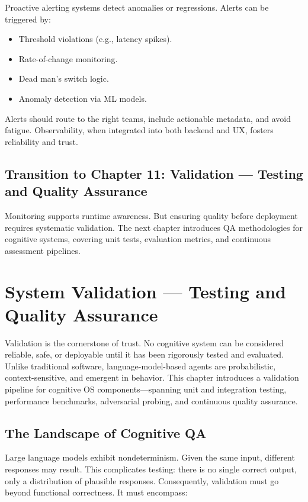 \documentclass{book}
\begin{document}
Proactive alerting systems detect anomalies or regressions. Alerts can be triggered by:

\begin{itemize}
  \item Threshold violations (e.g., latency spikes).
  \item Rate-of-change monitoring.
  \item Dead man’s switch logic.
  \item Anomaly detection via ML models.
\end{itemize}

Alerts should route to the right teams, include actionable metadata, and avoid fatigue. Observability, when integrated into both backend and UX, fosters reliability and trust.

\section*{Transition to Chapter 11: Validation — Testing and Quality Assurance}

Monitoring supports runtime awareness. But ensuring quality before deployment requires systematic validation. The next chapter introduces QA methodologies for cognitive systems, covering unit tests, evaluation metrics, and continuous assessment pipelines.

\chapter{System Validation — Testing and Quality Assurance}

Validation is the cornerstone of trust. No cognitive system can be considered reliable, safe, or deployable until it has been rigorously tested and evaluated. Unlike traditional software, language-model-based agents are probabilistic, context-sensitive, and emergent in behavior. This chapter introduces a validation pipeline for cognitive OS components—spanning unit and integration testing, performance benchmarks, adversarial probing, and continuous quality assurance.

\section{The Landscape of Cognitive QA}

Large language models exhibit nondeterminism. Given the same input, different responses may result. This complicates testing: there is no single correct output, only a distribution of plausible responses. Consequently, validation must go beyond functional correctness. It must encompass:
\end{document}
